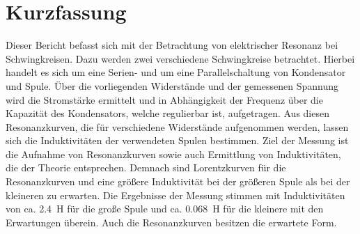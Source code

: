 
\section{Kurzfassung}

Dieser Bericht befasst sich mit der Betrachtung von elektrischer Resonanz bei Schwingkreisen.
Dazu werden zwei verschiedene Schwingkreise betrachtet.
Hierbei handelt es sich um eine Serien- und um eine Parallelschaltung von Kondensator und Spule.
Über die vorliegenden Widerstände und der gemessenen Spannung wird die Stromstärke ermittelt und in Abhängigkeit der Frequenz über die Kapazität des Kondensators, welche regulierbar ist, aufgetragen.
Aus diesen Resonanzkurven, die für verschiedene Widerstände aufgenommen werden, lassen sich die Induktivitäten der verwendeten Spulen bestimmen.
Ziel der Messung ist die Aufnahme von Resonanzkurven sowie auch Ermittlung von Induktivitäten, die der Theorie entsprechen.
Demnach sind Lorentzkurven für die Resonanzkurven und eine größere Induktivität bei der größeren Spule als bei der kleineren zu erwarten.
Die Ergebnisse der Messung stimmen mit Induktivitäten von ca. \SI{2,4}{\henry} für die große Spule und ca. \SI{0,068}{\henry} für die kleinere mit den Erwartungen überein.
Auch die Resonanzkurven besitzen die erwartete Form.